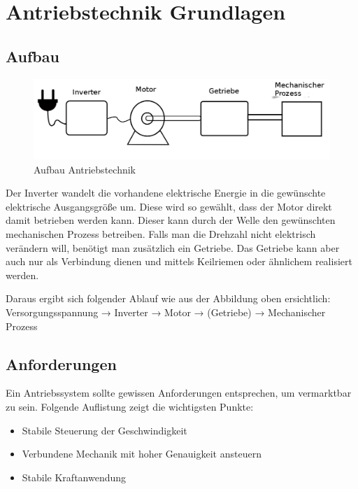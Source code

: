 \documentclass[12pt]{scrreprt} %
\begin{document}
\section{Antriebstechnik Grundlagen}
\label{sec:antriebstechnikGrundlagen}

\subsection{Aufbau}
\label{sec:aufbau}
\begin{figure}[!ht]
\begin{center}
	\caption{Aufbau Antriebstechnik}
	\includegraphics[width=1\textwidth]{AntriebstechnikAufbau}
\end{center}
\end{figure}

Der Inverter wandelt die vorhandene elektrische Energie in die gewünschte elektrische Ausgangsgröße um. 
Diese wird so gewählt, dass der Motor direkt damit betrieben werden kann. Dieser kann durch der Welle den gewünschten mechanischen Prozess betreiben.  Falls man die Drehzahl nicht elektrisch verändern will, benötigt man zusätzlich ein Getriebe. Das Getriebe kann aber auch nur als Verbindung dienen und mittels Keilriemen oder ähnlichem realisiert werden.

Daraus ergibt sich folgender Ablauf wie aus der Abbildung oben ersichtlich:
Versorgungsspannung → Inverter → Motor → (Getriebe) → Mechanischer Prozess

\subsection{Anforderungen}
\label{sec:anforderungen}

Ein Antriebssystem sollte gewissen Anforderungen entsprechen, um vermarktbar zu sein. Folgende Auflistung zeigt die wichtigsten Punkte:

\begin{itemize}
\item{Stabile Steuerung der Geschwindigkeit}
\item{Verbundene Mechanik mit hoher Genauigkeit ansteuern}
\item{Stabile Kraftanwendung}
\end{itemize}
\end{document}
